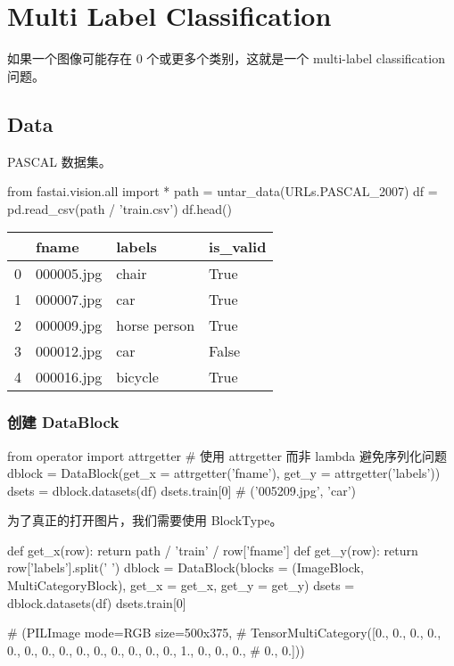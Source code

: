 \documentclass{ctexart}
\newenvironment{monos}{\VerbatimEnvironment\begin{pythoncode}}{\end{pythoncode}}
\begin{document}
\section{Multi Label Classification}

如果一个图像可能存在 0 个或更多个类别，这就是一个 multi-label classification 问题。

\subsection{Data}

PASCAL 数据集。

\begin{monos}
from fastai.vision.all import *
path = untar_data(URLs.PASCAL_2007)
df = pd.read_csv(path / 'train.csv')
df.head()
\end{monos}

\begin{longtable}[]{@{}llll@{}}
    \toprule()
      & fname      & labels       & is\_valid \\
    \midrule()
    \endhead
    0 & 000005.jpg & chair        & True      \\
    1 & 000007.jpg & car          & True      \\
    2 & 000009.jpg & horse person & True      \\
    3 & 000012.jpg & car          & False     \\
    4 & 000016.jpg & bicycle      & True      \\
    \bottomrule()
\end{longtable}

\subsubsection{创建 DataBlock}

\begin{monos}
from operator import attrgetter 
# 使用 attrgetter 而非 lambda 避免序列化问题
dblock = DataBlock(get_x = attrgetter('fname'), get_y = attrgetter('labels'))
dsets = dblock.datasets(df)
dsets.train[0] 
# ('005209.jpg', 'car')
\end{monos}

为了真正的打开图片，我们需要使用 BlockType。

\begin{monos}
def get_x(row):
    return path / 'train' / row['fname']
def get_y(row):
    return row['labels'].split(' ')
dblock = DataBlock(blocks = (ImageBlock, MultiCategoryBlock),
                  get_x = get_x,
                  get_y =  get_y)
dsets = dblock.datasets(df)
dsets.train[0]

# (PILImage mode=RGB size=500x375,
# TensorMultiCategory([0., 0., 0., 0., 0., 0., 0., 0., 0., 0., 0., 0., 0., 0., 1., 0., 0., 0.,
#        0., 0.]))
\end{monos}
\end{document}
